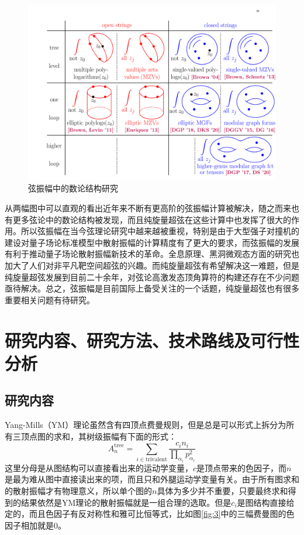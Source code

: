 \documentclass[type = bachelor]{whu-proposal}  %
\begin{document}
\begin{figure}[H]
	\centering
	\includegraphics[width=1.0\linewidth]{figures/2.pdf}
	\caption{弦振幅中的数论结构研究}
	\label{fig:2}
\end{figure}

从两幅图中可以直观的看出近年来不断有更高阶的弦振幅计算被解决，随之而来也有更多弦论中的数论结构被发现，而且纯旋量超弦在这些计算中也发挥了很大的作用。所以弦振幅在当今弦理论研究中越来越被重视，特别是由于大型强子对撞机的建设对量子场论标准模型中散射振幅的计算精度有了更大的要求，而弦振幅的发展有利于推动量子场论散射振幅新技术的革命。全息原理、黑洞微观态方面的研究也加大了人们对非平凡靶空间超弦的兴趣。而纯旋量超弦有希望解决这一难题，但是纯旋量超弦发展到目前二十余年，对弦论高激发态顶角算符的构建还存在不少问题亟待解决。总之，弦振幅是目前国际上备受关注的一个话题，纯旋量超弦也有很多重要相关问题有待研究。

\section{研究内容、研究方法、技术路线及可行性分析}
\subsection{研究内容}
Yang-Mills（YM）理论虽然含有四顶点费曼规则，但是总是可以形式上拆分为所有三顶点图的求和，其树级振幅有下面的形式：
\begin{equation}
	A_n^\mathrm{tree}=\sum_{i\in\mathrm{trivalent}}\frac{c_in_i}{\prod_{\alpha_i}p_{\alpha_i}^2}
\end{equation}
这里分母是从图结构可以直接看出来的运动学变量，$c$是顶点带来的色因子，而$n$是最为难从图中直接读出来的项，而且只和外腿运动学变量有关。由于所有图求和的散射振幅才有物理意义，所以单个图的$n$具体为多少并不重要，只要最终求和得到的结果依然是YM理论的散射振幅就是一组合理的选取。但是$c_i$是图结构直接给定的，而且色因子有反对称性和雅可比恒等式，比如图\ref{fig:3}中的三幅费曼图的色因子相加就是0。
\end{document}
